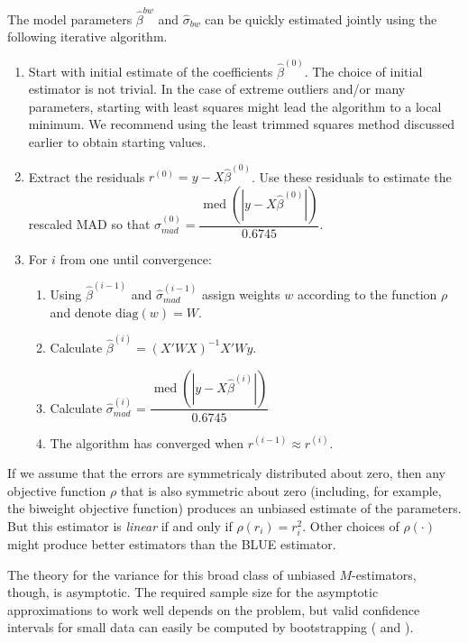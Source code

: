 \documentclass[12pt]{article}
\DeclareMathOperator{\med}{med}
\begin{document}
The model parameters $\hat{\beta}^{bw}$ and $\hat{\sigma}_{bw}$ can be quickly estimated jointly using the following iterative algorithm.
\begin{enumerate}
\item Start with initial estimate of the coefficients $\hat{\beta}^{(0)}$. The choice of initial estimator is not trivial. 
In the case of extreme outliers and/or many parameters, starting with least squares might lead the algorithm to a local minimum. 
We recommend using the least trimmed squares method discussed earlier to obtain starting values.
\item Extract the residuals $r^{(0)} = y - X\hat{\beta}^{(0)}$. 
Use these residuals to estimate the rescaled MAD so that $\hat{\sigma}^{(0)}_{mad} = \dfrac{\med\left( |y - X\hat{\beta}^{(0)}|\right)}{0.6745}$.
\item For $i$ from one until convergence:
        \begin{enumerate}
        \item Using $\hat{\beta}^{(i-1)}$ and $\hat{\sigma}^{(i-1)}_{mad}$ assign weights $w$ according to the function $\rho$ and denote $\text{diag}(w) = W$.
        \item Calculate $\hat{\beta}^{(i)} = (X'WX)^{-1}X'Wy$.
        \item Calculate $\hat{\sigma}^{(i)}_{mad} = \dfrac{\med\left( |y - X\hat{\beta}^{(i)}|\right)}{0.6745}$
        \item The algorithm has converged when $r^{(i-1)} \approx r^{(i)}$.
        \end{enumerate}
\end{enumerate}

If we assume that the errors are symmetricaly distributed about zero, then any objective function $\rho$ that is also symmetric about zero (including, for example, the biweight objective function) produces an unbiased estimate of the parameters. 
But this estimator is \textit{linear} if and only if $\rho(r_i) = r_i^2$. Other choices of $\rho(\cdot)$ might produce better estimators than the BLUE estimator.  

The theory for the variance for this broad class of unbiased $M$-estimators, though, is asymptotic. 
The required sample size for the asymptotic approximations to work well depends on the problem, but valid confidence intervals for small data can easily be computed by bootstrapping (\citealt{Efron1981} and \citealt{MooneyDuval1993}). 
\end{document}
